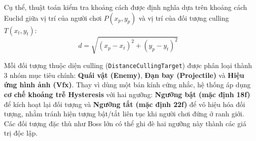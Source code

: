 Cụ thể, thuật toán kiểm tra khoảng cách được định nghĩa dựa trên khoảng cách Euclid giữa vị trí của người chơi $P(x_p, y_p)$ và vị trí của đối tượng culling $T(x_t, y_t)$:
\begin{equation}
d = \sqrt{(x_p - x_t)^2 + (y_p - y_t)^2}
\end{equation}

Mỗi đối tượng thuộc diện culling (\texttt{DistanceCullingTarget}) được phân loại thành 3 nhóm mục tiêu chính: \textbf{Quái vật (Enemy)}, \textbf{Đạn bay (Projectile)} và \textbf{Hiệu ứng hình ảnh (Vfx)}. Thay vì dùng một bán kính cứng nhắc, hệ thống áp dụng \textbf{cơ chế khoảng trễ Hysteresis} với hai ngưỡng: \textbf{Ngưỡng bật (mặc định 18f)} để kích hoạt lại đối tượng và \textbf{Ngưỡng tắt (mặc định 22f)} để vô hiệu hóa đối tượng, nhằm tránh hiện tượng bật/tắt liên tục khi người chơi đứng ở ranh giới. Các đối tượng đặc thù như Boss lớn có thể ghi đè hai ngưỡng này thành các giá trị độc lập.

